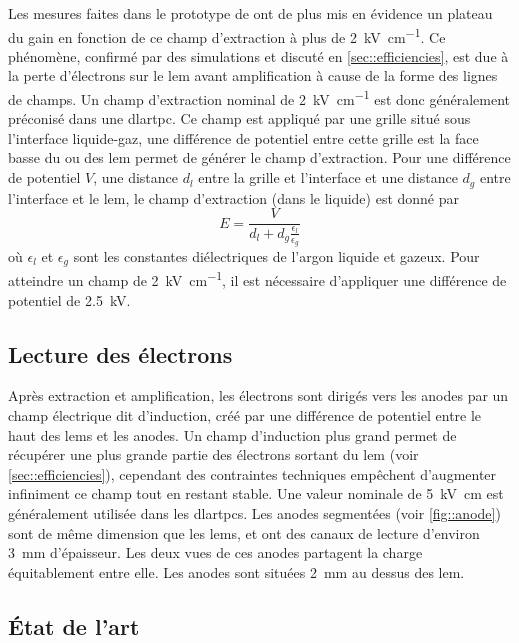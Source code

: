       Les mesures faites dans le prototype de \threeL{} ont de plus mis en évidence un plateau du gain en fonction de ce champ d'extraction à plus de \SI{2}{\kilo\volt\per\centi\meter}. Ce phénomène, confirmé par des simulations et discuté en \autoref{sec::efficiencies}, est due à la perte d'électrons sur le \gls{lem} avant amplification à cause de la forme des lignes de champs. Un champ d'extraction nominal de \SI{2}{\kilo\volt\per\centi\meter} est donc généralement préconisé dans une \gls{dlartpc}. Ce champ est appliqué par une grille situé sous l'interface liquide-gaz, une différence de potentiel entre cette grille est la face basse du ou des \gls{lem} permet de générer le champ d'extraction. Pour une différence de potentiel $V$, une distance $d_l$ entre la grille et l'interface et une distance $d_g$ entre l'interface et le \gls{lem}, le champ d'extraction (dans le liquide) est donné par
      \begin{equation}
        E = \frac{V}{d_l + d_g\frac{\epsilon_l}{\epsilon_g}}
      \end{equation}
      où $\epsilon_l$ et $\epsilon_g$ sont les constantes diélectriques de l'argon liquide et gazeux. Pour atteindre un champ de \SI{2}{\kilo\volt\per\centi\meter}, il est nécessaire d'appliquer une différence de potentiel de \SI{2.5}{\kilo\volt}.

    \subsection{Lecture des électrons}
    
      Après extraction et amplification, les électrons sont dirigés vers les anodes par un champ électrique dit d'induction, créé par une différence de potentiel entre le haut des \glspl{lem} et les anodes. Un champ d'induction plus grand permet de récupérer une plus grande partie des électrons sortant du \gls{lem} (voir \autoref{sec::efficiencies}), cependant des contraintes techniques empêchent d'augmenter infiniment ce champ tout en restant stable. Une valeur nominale de \SI{5}{\kilo\volt\centi\meter} est généralement utilisée dans les \glspl{dlartpc}. Les anodes segmentées (voir \autoref{fig::anode}) sont de même dimension que les \glspl{lem}, et ont des canaux de lecture d'environ \SI{3}{\milli\meter} d'épaisseur. Les deux vues de ces anodes partagent la charge équitablement entre elle. Les anodes sont situées \SI{2}{\milli\meter} au dessus des \gls{lem}.

    \subsection{État de l'art}

